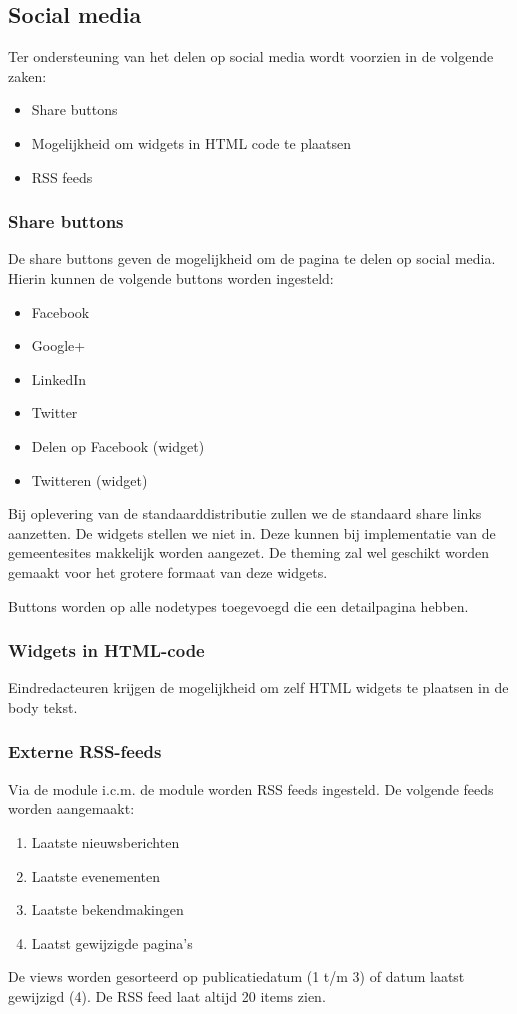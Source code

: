 \subsection{Social media}

Ter ondersteuning van het delen op social media wordt voorzien in de volgende zaken:
\begin{itemize}
\item Share buttons
\item Mogelijkheid om widgets in HTML code te plaatsen
\item RSS feeds
\end{itemize}

\subsubsection{Share buttons}

De share buttons geven de mogelijkheid om de pagina te delen op social media. Hierin kunnen de volgende buttons worden ingesteld:
\begin{itemize}
\item Facebook
\item Google+
\item LinkedIn
\item Twitter
\item Delen op Facebook (widget)
\item Twitteren (widget)
\end{itemize}

Bij oplevering van de standaarddistributie zullen we de standaard share links aanzetten. De widgets stellen we niet in. Deze kunnen bij implementatie van de gemeentesites makkelijk worden aangezet. De theming zal wel geschikt worden gemaakt voor het grotere formaat van deze widgets.

Buttons worden op alle nodetypes toegevoegd die een detailpagina hebben.

\subsubsection{Widgets in HTML-code}

Eindredacteuren krijgen de mogelijkheid om zelf HTML widgets te plaatsen in de body tekst.

\subsubsection{Externe RSS-feeds}

Via de  module i.c.m. de  module worden RSS feeds ingesteld. De volgende feeds worden aangemaakt:
\begin{enumerate}
\item Laatste nieuwsberichten
\item Laatste evenementen
\item Laatste bekendmakingen
\item Laatst gewijzigde pagina's
\end{enumerate}
De views worden gesorteerd op publicatiedatum (1 t/m 3) of datum laatst gewijzigd (4). De RSS feed laat altijd 20 items zien.